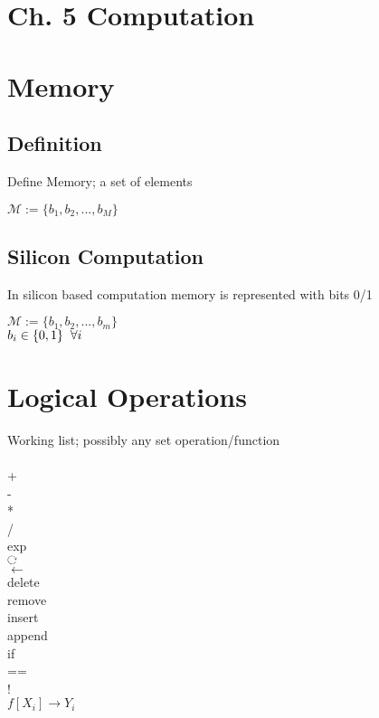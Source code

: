 \documentclass[11pt]{article}
\def \loop {\ensuremath{\rotatebox[origin=c]{-90}{$\circlearrowright$}}}
\begin{document}
\section*{Ch. 5 Computation}





\section{Memory}

\subsection{Definition}
Define Memory; a set of elements
\begin{center}
$\mathcal{M} := \{b_1,b_2,...,b_M\}$
\end{center}

\subsection{Silicon Computation}
In silicon based computation memory is represented with bits 0/1
\begin{center}
$\mathcal{M} := \{b_1,b_2,...,b_m\}$
\\ \vspace{2mm}
$b_i \in \{0,1\} \hspace{2mm} \forall i$
\end{center}

\section{Logical Operations}
Working list; possibly any set operation/function\\
\\
+\\
-\\
*\\
/\\
exp\\
\loop\\
$\leftarrow$\\
delete\\
remove\\
insert\\
append\\
if\\
==\\
!\\
$f[X_i] \rightarrow Y_i$\\
\end{document}
